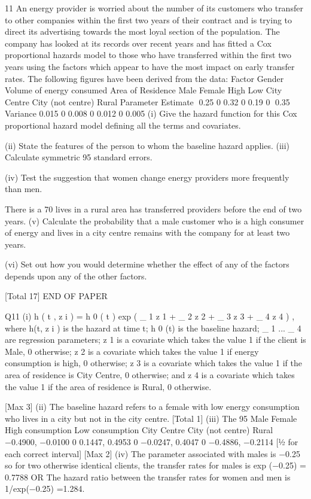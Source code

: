 \documentclass[a4paper,12pt]{article}
\begin{document}
11
An energy provider is worried about the number of its customers who transfer to other
companies within the first two years of their contract and is trying to direct its
advertising towards the most loyal section of the population.
The company has looked at its records over recent years and has fitted a Cox
proportional hazards model to those who have transferred within the first two years
using the factors which appear to have the most impact on early transfer rates.
The following figures have been derived from the data:
Factor
Gender
Volume of energy
consumed
Area of Residence
Male
Female
High
Low
City Centre
City (not centre)
Rural
Parameter
Estimate
0.25
0
0.32
0
0.19
0
0.35
Variance
0.015
0
0.008
0
0.012
0
0.005
(i) Give the hazard function for this Cox proportional hazard model defining all
the terms and covariates.

(ii) State the features of the person to whom the baseline hazard applies.
(iii) Calculate symmetric 95%
standard errors.

(iv) Test the suggestion that women change energy providers more frequently than
men.


There is a 70%
lives in a rural area has transferred providers before the end of two years.
(v) Calculate the probability that a male customer who is a high consumer of
energy and lives in a city centre remains with the company for at least two
years.

(vi) Set out how you would determine whether the effect of any of the factors
depends upon any of the other factors.

[Total 17]
END OF PAPER



Q11 (i)
h ( t , z i ) = h 0 ( t ) exp ( \beta_ 1 z 1 + \beta_ 2 z 2 + \beta_ 3 z 3 + \beta_ 4 z 4 ) , where 
h(t, z i ) is the hazard at time t; 
h 0 (t) is the baseline hazard; 
\beta_ 1 ... \beta_ 4 are regression parameters; 
z 1 is a covariate which takes the value 1 if the client is Male, 0 otherwise;
z 2 is a covariate which takes the value 1 if energy consumption is high, 0
otherwise;
z 3 is a covariate which takes the value 1 if the area of residence is City Centre,
0 otherwise; and
z 4 is a covariate which takes the value 1 if the area of residence is Rural, 0
otherwise.

[Max 3]
(ii) The baseline hazard refers to a female with low energy consumption who lives
in a city but not in the city centre.
[Total 1]
(iii) The 95%
Male
Female
High consumption
Low consumption
City Centre
City (not centre)
Rural
−0.4900, −0.0100
0
0.1447, 0.4953
0
−0.0247, 0.4047
0
−0.4886, −0.2114
[1⁄2 for each correct interval]
[Max 2]%
(iv)
The parameter associated with males is −0.25 so for two otherwise identical
clients, the transfer rates for males is exp (−0.25) = 0.7788
OR
The hazard ratio between the transfer rates for women and men is
1/exp(−0.25) =1.284.
\end{document}

